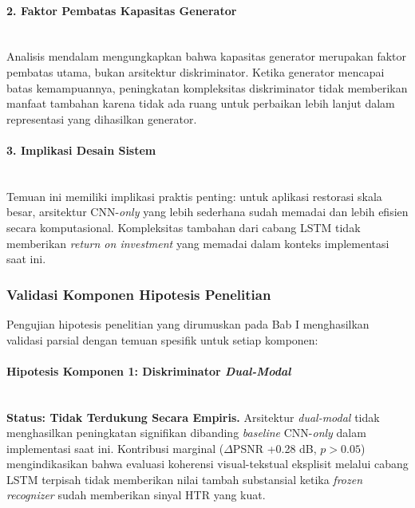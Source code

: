 \documentclass[12pt,a4paper]{article}
\begin{document}
\paragraph{2. Faktor Pembatas Kapasitas Generator} \mbox{}\\[0.1em]
Analisis mendalam mengungkapkan bahwa kapasitas generator merupakan faktor pembatas utama, bukan arsitektur diskriminator. Ketika generator mencapai batas kemampuannya, peningkatan kompleksitas diskriminator tidak memberikan manfaat tambahan karena tidak ada ruang untuk perbaikan lebih lanjut dalam representasi yang dihasilkan generator.

\paragraph{3. Implikasi Desain Sistem} \mbox{}\\[0.1em]
Temuan ini memiliki implikasi praktis penting: untuk aplikasi restorasi skala besar, arsitektur CNN-\textit{only} yang lebih sederhana sudah memadai dan lebih efisien secara komputasional. Kompleksitas tambahan dari cabang LSTM tidak memberikan \textit{return on investment} yang memadai dalam konteks implementasi saat ini.

\vspace{0.8em}

\subsubsection{Validasi Komponen Hipotesis Penelitian}
\label{subsubsec:validasi-hipotesis}

Pengujian hipotesis penelitian yang dirumuskan pada Bab I menghasilkan validasi parsial dengan temuan spesifik untuk setiap komponen:

\paragraph{Hipotesis Komponen 1: Diskriminator \textit{Dual-Modal}} \mbox{}\\[0.1em]
\textbf{Status: Tidak Terdukung Secara Empiris.} Arsitektur \textit{dual-modal} tidak menghasilkan peningkatan signifikan dibanding \textit{baseline} CNN-\textit{only} dalam implementasi saat ini. Kontribusi marginal ($\Delta$PSNR +0.28 dB, $p>0.05$) mengindikasikan bahwa evaluasi koherensi visual-tekstual eksplisit melalui cabang LSTM terpisah tidak memberikan nilai tambah substansial ketika \textit{frozen recognizer} sudah memberikan sinyal HTR yang kuat.
\end{document}
